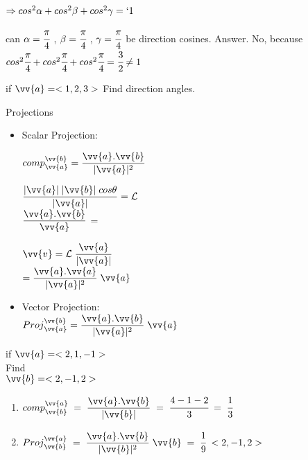 $\Rightarrow cos^2 \alpha + cos^2 \beta + cos^2 \gamma = `1$\\
\noindent{\color{smalt(darkpowderblue)}\rule{\linewidth}{.2mm}}
\begin{example}
can $\alpha = \cfrac{\pi}{4}$ , $\beta = \cfrac{\pi}{4}$ , $\gamma = \cfrac{\pi}{4}$ be direction cosines.
Answer. No, because \\
$cos^2 \cfrac{\pi}{4} + cos^2 \cfrac{\pi}{4} + cos^2 \cfrac{\pi}{4} = \cfrac{3}{2} \not= 1$
\end{example}
\begin{exercise}
if $\vv{a} = <1 , 2, 3>$ Find direction angles.
\end{exercise}
\large{Projections}
\begin{itemize}
\item Scalar Projection: \\
\begin{paracol}{3}
${comp}_{\vv{a}}^{\vv{b}} = \dfrac{\vv{a} . \vv{b}}{|\vv{a}|^2}$ 
\switchcolumn

$\dfrac{|\vv{a}| \; |\vv{b}| \; cos\theta}{|\vv{a}|} = \mathcal{L}$\\
$\dfrac{\vv{a} . \vv{b}}{\vv{a}}$ = 

\switchcolumn

$\vv{v} = \mathcal{L} \; \dfrac{\vv{a}}{|\vv{a}|}$ \\
\hspace*{0.5cm} $= \dfrac{\vv{a} . \vv{a}}{|\vv{a}|^2} \; \vv{a} $
\end{paracol}
\item Vector Projection:\\
${Proj}_{\vv{a}}^{\vv{b}} = \dfrac{\vv{a} . \vv{b}}{|\vv{a}|^2} \; \vv{a}$
\end{itemize}
\noindent{\color{smalt(darkpowderblue)}\rule{\linewidth}{.2mm}}
\begin{example}
if $\vv{a} = <2,1,-1>$  \\
\hspace*{5cm} Find\\
\hspace*{1.6cm} $\vv{b} =<2,-1,2>$\\
\begin{enumerate}
\item ${comp}_{\vv{b}}^{\vv{a}} \; = \; \dfrac{\vv{a} . \vv{b}}{|\vv{b}|} \; = \; \cfrac{4 - 1 - 2}{3} \; = \; \cfrac{1}{3}$
\item ${Proj}_{\vv{b}}^{\vv{a}} \; = \; \dfrac{\vv{a} . \vv{b}}{|\vv{b}|^2} \; \vv{b} \; = \; \cfrac{1}{9} \;<2,-1,2>$
\end{enumerate}
\end{example}
